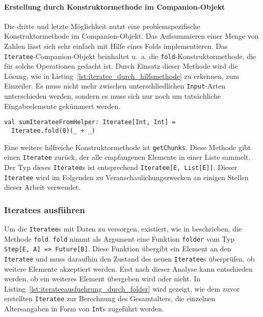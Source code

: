 
\paragraph{Erstellung durch Konstruktormethode im Companion-Objekt} %
\label{par:erstellung_durch_konstruktormethode_im_companion_objekt}\mbox{} %

Die dritte und letzte Möglichkeit nutzt eine problemspezifische Konstruktormethode im Companion-Objekt.
Das Aufsummieren einer Menge von Zahlen lässt sich sehr einfach mit Hilfe eines Folds implementieren.
Das \lstinline|Iteratee|-Companion-Objekt beinhaltet u.~a. die \lstinline|fold|-Konstruktormethode, die für solche Operationen gedacht ist.
Durch Einsatz dieser Methode wird die Lösung, wie in Listing~\ref{lst:iteratee_durch_hilfsmethode} zu erkennen, zum Einzeiler.
Es muss nicht mehr zwischen unterschliedlichen \lstinline|Input|-Arten unterschieden werden, sondern es muss sich nur noch um tatsächliche Eingabeelemente gekümmert werden.

\begin{lstlisting}[caption=Erstellung eines Iteratees durch Konstruktormethode im Companion-Objekt, label=lst:iteratee_durch_hilfsmethode]
val sumIterateeFromHelper: Iteratee[Int, Int] =
  Iteratee.fold(0)(_ + _)
\end{lstlisting}

Eine weitere hilfreiche Konstruktormethode ist \lstinline|getChunks|.
Diese Methode gibt einen \lstinline|Iteratee| zurück, der alle empfangenen Elemente in einer Liste sammelt.
Der Typ dieses \lstinline|Iteratee|s ist entsprechend \lstinline|Iteratee[E, List[E]]|.
Dieser \lstinline|Iteratee| wird im Folgenden zu Veranschaulichungszwecken an einigen Stellen dieser Arbeit verwendet.



\subsubsection{Iteratees ausführen} %
\label{ssub:iteratees_ausfuehren}

Um die \lstinline|Iteratee|s mit Daten zu versorgen, existiert, wie in  beschrieben, die Methode \lstinline|fold|.
\lstinline|fold| nimmt als Argument eine Funktion \lstinline|folder| vom Typ \lstinline[breaklines=true]|Step[E, A] => Future[B]|.
Diese Funktion übergibt ein Element an den \lstinline|Iteratee| und muss daraufhin den Zustand des neuen \lstinline|Iteratee|s überprüfen, ob weitere Elemente akzeptiert werden.
Erst nach dieser Analyse kann entschieden werden, ob ein weiteres Element übergeben wird oder nicht.
In Listing~\ref{lst:iterateeausfuehrung_durch_folder} wird gezeigt, wie dem zuvor erstellten \lstinline|Iteratee| zur Berechnung des Gesamtalters, die einzelnen Altersangaben in Form von \lstinline|Int|s zugeführt werden.

